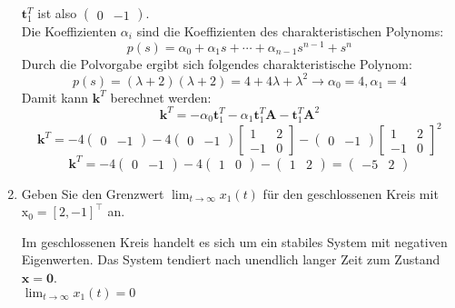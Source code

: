 \documentclass[crop=false]{standalone}
\begin{document}
\begin{task}
\begin{enumerate}[i]
\begin{solution}
 $\mathbf{t}_{1}^{T}$ ist also $\begin{pmatrix} 0 & -1\end{pmatrix}$.\\ Die Koeffizienten $\alpha_i$ sind die Koeffizienten des charakteristischen Polynoms:
 \[ 
p(s)=\alpha_{0}+\alpha_{1} s+\cdots+\alpha_{n-1} s^{n-1}+s^{n}
 \]
 Durch die Polvorgabe ergibt sich folgendes charakteristische Polynom:
  \[ 
p(s)=(\lambda+2)(\lambda+2)= 4+4\lambda+\lambda^2 \rightarrow \alpha_0 = 4, \alpha_1 = 4
 \]
 Damit kann $\mathbf{k}^{T}$ berechnet werden:
 \[ 
\mathbf{k}^{T}=-\alpha_{0} \mathbf{t}_{1}^{T}-\alpha_{1} \mathbf{t}_{1}^{T} \mathbf{A}-\mathbf{t}_{1}^{T} \mathbf{A}^{2}
 \]
 \[
 \mathbf{k}^{T}=-4 \begin{pmatrix} 0 & -1\end{pmatrix}-4 \begin{pmatrix} 0 & -1\end{pmatrix} \left[\begin{array}{cc}{1} & {2} \\ {-1} & {0}\end{array}\right]-\begin{pmatrix} 0 & -1\end{pmatrix} \left[\begin{array}{cc}{1} & {2} \\ {-1} & {0}\end{array}\right]^{2}
 \]
  \[
 \mathbf{k}^{T}=-4 \begin{pmatrix} 0 & -1\end{pmatrix}-4 \begin{pmatrix} 1 & 0\end{pmatrix} -\begin{pmatrix} 1 & 2\end{pmatrix} = \begin{pmatrix} -5 & 2\end{pmatrix}
 \]
\end{solution}
  \item Geben Sie den Grenzwert $\lim _{t \rightarrow \infty} x_{1}(t)$ für den geschlossenen Kreis mit
$\mathrm{x}_{0}=[2,-1]^{\top}$ an.
\begin{solution}
Im geschlossenen Kreis handelt es sich um ein stabiles System mit negativen Eigenwerten. Das System tendiert nach unendlich langer Zeit zum Zustand $\mathbf{x} = \mathbf{0}$.\\
$\lim _{t \rightarrow \infty} x_{1}(t) = 0$
\end{solution}
\end{enumerate}
\end{task}
\end{document}
